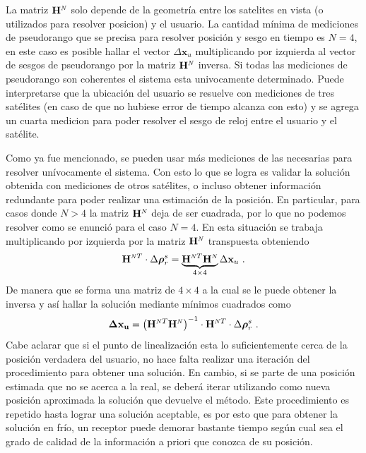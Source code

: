 \documentclass[a4paper,12pt,oneside,onecolumn,final,openright]{book}%
\begin{document}
La matriz $\mathbf{H}^{\scaleto{N}{4pt}}$ solo depende de la geometría entre los satelites en vista (o utilizados para resolver posicion) y el usuario. La cantidad mínima de mediciones de pseudorango que se precisa para resolver posición y sesgo en tiempo es $N=4$, en este caso es posible hallar el vector $\Delta \mathbf{x}_u$ multiplicando por izquierda al vector de sesgos de pseudorango por la matriz $\mathbf{H}^{\scaleto{N}{4pt}}$ inversa. Si todas las mediciones de pseudorango son coherentes el sistema esta univocamente determinado. Puede interpretarse que la ubicación del usuario se resuelve con mediciones de tres satélites (en caso de que no hubiese error de tiempo alcanza con esto) y se agrega un cuarta medicion para poder resolver el sesgo de reloj entre el usuario y el satélite.

	Como ya fue mencionado, se pueden usar más mediciones de las necesarias para resolver unívocamente el sistema. Con esto lo que se logra es validar la solución obtenida con mediciones de otros satélites, o incluso obtener información redundante para poder realizar una estimación de la posición. En particular, para casos donde $N>4$ la matriz $\mathbf{H}^{\scaleto{N}{4pt}}$ deja de ser cuadrada, por lo que no podemos resolver como se enunció para el caso $N=4$. En esta situación se trabaja multiplicando por izquierda por la matriz $\mathbf{H}^{\scaleto{N}{4pt}}$ transpuesta obteniendo
\begin{equation}
	\mathbf{H}^{\scaleto{N}{4pt}T} \cdot \Delta \boldsymbol{\rho}_r^s = \underbrace{\mathbf{H}^{\scaleto{N}{4pt}T} \mathbf{H}^{\scaleto{N}{4pt}}}_{4\times 4} \Delta \mathbf{x}_u \ .
\end{equation}
	De manera que se forma una matriz de $4\times 4$ a la cual se le puede obtener la inversa y así hallar la solución mediante mínimos cuadrados como 
\begin{equation}
	\mathbf{\Delta x_u} = \left(\mathbf{H}^{\scaleto{N}{4pt}T} \mathbf{H}^{\scaleto{N}{4pt}}\right)^{-1} \cdot \mathbf{H}^{\scaleto{N}{4pt}T} \cdot \Delta \boldsymbol{\rho}_r^s \ .
\end{equation}
	Cabe aclarar que si el punto de linealización esta lo suficientemente cerca de la posición verdadera del usuario, no hace falta realizar una iteración del procedimiento para obtener una solución. En cambio, si se parte de una posición estimada que no se acerca a la real, se deberá iterar utilizando como nueva posición aproximada la solución que devuelve el método. Este procedimiento es repetido hasta lograr una solución aceptable, es por esto que para obtener la solución en frío, un receptor puede demorar bastante tiempo según cual sea el grado de calidad de la información a priori que conozca de su posición.\\
	
\end{document}
